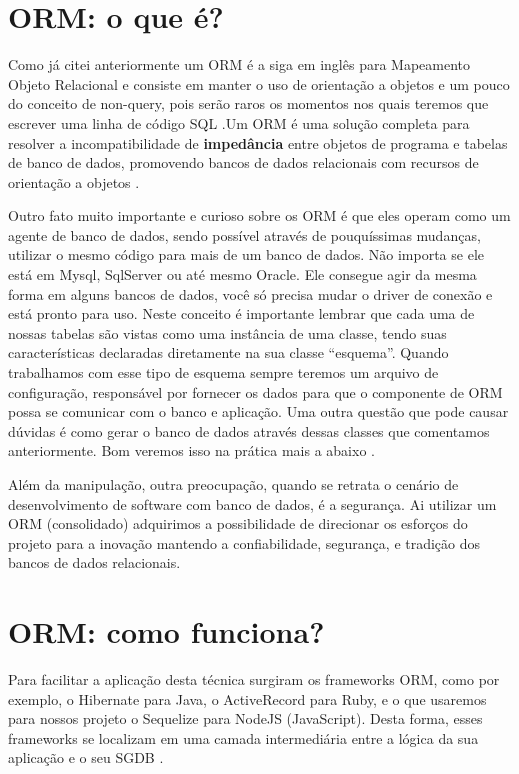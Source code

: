 \section{ORM: o que é? }

Como já citei anteriormente um ORM é a siga em inglês para Mapeamento Objeto Relacional e consiste em manter o uso de orientação a objetos e um pouco do conceito de non-query, pois serão raros os momentos nos quais teremos que escrever uma linha de código SQL \cite{Aylon2020Muramatsu}.Um ORM é uma solução completa para resolver a incompatibilidade de \textbf{impedância} entre objetos de programa e tabelas de banco de dados, promovendo bancos de dados relacionais com recursos de orientação a objetos \cite{song2012use}.

Outro fato muito importante e curioso sobre os ORM é que eles operam como um agente de banco de dados, sendo possível através de pouquíssimas mudanças, utilizar o mesmo código para mais de um banco de dados. Não importa se ele está em Mysql, SqlServer ou até mesmo Oracle. Ele consegue agir da mesma forma em alguns bancos de dados, você só precisa mudar o driver de conexão e está pronto para uso. Neste conceito é importante lembrar que cada uma de nossas tabelas são vistas como uma instância de uma classe, tendo suas características declaradas diretamente na sua classe ``esquema''. Quando trabalhamos com esse tipo de esquema sempre teremos um arquivo de configuração, responsável por fornecer os dados para que o componente de ORM possa se comunicar com o banco e aplicação. Uma outra questão que pode causar dúvidas é como gerar o banco de dados através dessas classes que comentamos anteriormente. Bom veremos isso na prática mais a abaixo \cite{Aylon2020Muramatsu}.

Além da manipulação, outra preocupação, quando se retrata o cenário de desenvolvimento de software com banco de dados, é a segurança. Ai utilizar um ORM (consolidado) adquirimos a possibilidade de direcionar os esforços do projeto para a inovação mantendo a confiabilidade, segurança, e tradição dos bancos de dados relacionais.

\section{ORM: como funciona?}

Para facilitar a aplicação desta técnica surgiram os frameworks ORM, como por exemplo, o Hibernate para Java, o ActiveRecord para Ruby, e o que usaremos para nossos projeto o Sequelize para NodeJS (JavaScript). Desta forma, esses frameworks se localizam em uma camada intermediária entre a lógica da sua aplicação e o seu SGDB \cite{orm202netmagazine}.


